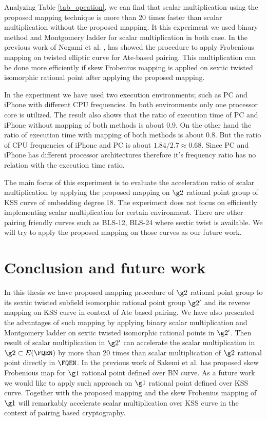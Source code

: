         Analyzing  Table \ref{tab_opeation}, we can find that scalar multiplication using the proposed  mapping technique  is more than 20 times faster than scalar multiplication without the proposed mapping. It this experiment we used binary method and Montgomery ladder for scalar multiplication in both case. In the previous work of Nogami et al. \cite{DBLP:journals/ieicet/NogamiSONAM09}, has showed the procedure to apply Frobenious mapping on twisted elliptic curve for Ate-based pairing. This multiplication can be done more efficiently if skew Frobenius mapping is applied on sextic twisted isomorphic rational point after applying the proposed mapping. 
        
        In the experiment we have used two execution environments; such as PC and iPhone with different CPU frequencies. In both environments only one processor core is utilized. The result also shows that the ratio of execution time of PC and iPhone without mapping  of both methods is about 0.9. On the other hand the ratio of execution time with mapping  of both methods is about 0.8. But the ratio of CPU frequencies of  iPhone and PC is about $1.84 / 2.7 \approx 0.68$. Since PC and iPhone has different processor architectures therefore it's frequency ratio has no relation with the execution time ratio. 
        
        The main focus of this experiment is to evaluate the  acceleration ratio of scalar multiplication by applying the proposed mapping on $\g2$ rational point group of  KSS curve of embedding degree 18. The experiment does not focus on efficiently implementing scalar multiplication for certain environment. There are other pairing friendly curves such as BLS-12, BLS-24 \cite{EPRINT:FreScoTes06} where sextic twist is available. We will try to apply the proposed mapping on those curves as our future work.
        
        \section{Conclusion and future work}
        In this thesis we have proposed mapping procedure of $\g2$ rational point group to its sextic twisted subfield isomorphic rational point group $\g2'$  and its reverse mapping on KSS curve in context of Ate based pairing. 
        We have also presented the advantages of such mapping by applying binary scalar multiplication and Montgomery ladder on sextic twisted isomorphic rational points in $\g2'$. 
        Then result of  scalar multiplication in $\g2'$ can accelerate the scalar multiplication in $\g2 \subset E(\FQEN)$ by more than 20 times than scalar multiplication of $\g2$ rational point directly in $\FQEN$. In the previous work of Sakemi et al. \cite{CANS:SNOKM08} has proposed skew Frobenious map for $\g1$ rational point defined over BN curve. As a future work we would like to apply such approach on $\g1$ rational point defined over KSS curve. Together with the proposed mapping and the skew Frobenius mapping of $\g1$ will remarkably accelerate scalar multiplication over KSS curve in the context of pairing based cryptography.  
        
